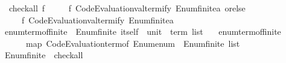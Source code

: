 \begin{isabellebody}
\isanewline
{}\isamarkupfalse%
\isanewline
\ \ {\isachardoublequoteopen}check{\isacharunderscore}{\kern0pt}all\ f\ {\isacharequal}{\kern0pt}\isanewline
\ \ \ \ {\isacharparenleft}{\kern0pt}f\ {\isacharparenleft}{\kern0pt}Code{\isacharunderscore}{\kern0pt}Evaluation{\isachardot}{\kern0pt}valtermify\ Enum{\isachardot}{\kern0pt}finite{\isacharunderscore}{\kern0pt}{}{\isachardot}{\kern0pt}a\ orelse\isanewline
\ \ \ \ \ f\ {\isacharparenleft}{\kern0pt}Code{\isacharunderscore}{\kern0pt}Evaluation{\isachardot}{\kern0pt}valtermify\ Enum{\isachardot}{\kern0pt}finite{\isacharunderscore}{\kern0pt}{}{\isachardot}{\kern0pt}a\isanewline
\isanewline
{}\isamarkupfalse%
\ enum{\isacharunderscore}{\kern0pt}term{\isacharunderscore}{\kern0pt}of{\isacharunderscore}{\kern0pt}finite{\isacharunderscore}{\kern0pt}{}\ {\isacharcolon}{\kern0pt}{\isacharcolon}{\kern0pt}\ {\isachardoublequoteopen}Enum{\isachardot}{\kern0pt}finite{\isacharunderscore}{\kern0pt}{}\ itself\ {\isasymRightarrow}\ unit\ {\isasymRightarrow}\ term\ list{\isachardoublequoteclose}\isanewline
\ \ \ {\isachardoublequoteopen}enum{\isacharunderscore}{\kern0pt}term{\isacharunderscore}{\kern0pt}of{\isacharunderscore}{\kern0pt}finite{\isacharunderscore}{\kern0pt}{}\ {\isacharequal}{\kern0pt}\isanewline
\ \ \ \ {\isacharparenleft}{\kern0pt}{\isasymlambda}{\isacharunderscore}{\kern0pt}\ {\isacharunderscore}{\kern0pt}{\isachardot}{\kern0pt}\ map\ Code{\isacharunderscore}{\kern0pt}Evaluation{\isachardot}{\kern0pt}term{\isacharunderscore}{\kern0pt}of\ {\isacharparenleft}{\kern0pt}Enum{\isachardot}{\kern0pt}enum\ {\isacharcolon}{\kern0pt}{\isacharcolon}{\kern0pt}\ Enum{\isachardot}{\kern0pt}finite{\isacharunderscore}{\kern0pt}{}\ list{\isacharparenright}{\kern0pt}{\isacharparenright}{\kern0pt}{\isachardoublequoteclose}\isanewline
\isanewline
{}\isamarkupfalse%
%
\isadelimproof
\ %
\endisadelimproof
%
\isatagproof
\isacommand{{\isachardot}{\kern0pt}{\isachardot}{\kern0pt}}\isamarkupfalse%
%
\endisatagproof
{\isafoldproof}%
%
\isadelimproof
%
\endisadelimproof
\isanewline
\isanewline
{}\isamarkupfalse%
\isanewline
\isanewline
{}\isamarkupfalse%
\ Enum{\isachardot}{\kern0pt}finite{\isacharunderscore}{\kern0pt}{}\ {\isacharcolon}{\kern0pt}{\isacharcolon}{\kern0pt}\ check{\isacharunderscore}{\kern0pt}all\isanewline

\end{isabellebody}
